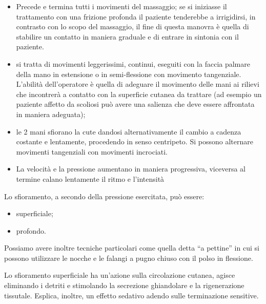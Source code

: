 \begin{itemize}
\item

  Precede e termina tutti i movimenti del massaggio; se si iniziasse il
  trattamento con una frizione profonda il paziente tenderebbe a
  irrigidirsi, in contrasto con lo scopo del massaggio, il fine di
  questa manovra è quella di stabilire un contatto in maniera graduale e
  di entrare in sintonia con il paziente.

\item

  si tratta di movimenti leggerissimi, continui, eseguiti con la faccia
  palmare della mano in estensione o in semi-flessione con movimento
  tangenziale. L'abilità dell'operatore è quella di adeguare il
  movimento delle mani ai rilievi che incontrerà a contatto con la
  superficie cutanea da trattare (ad esempio un paziente affetto da
  scoliosi può avere una salienza che deve essere affrontata in maniera
  adeguata);

\item

  le 2 mani sfiorano la cute dandosi alternativamente il cambio a
  cadenza costante e lentamente, procedendo in senso centripeto. Si
  possono alternare movimenti tangenziali con movimenti incrociati.

\item

  La velocità e la pressione aumentano in maniera progressiva, viceversa
  al termine calano lentamente il ritmo e l'intensità

\end{itemize}

Lo sfioramento, a secondo della pressione esercitata, può essere:

\begin{itemize}
\item
  superficiale;
\item
  profondo.
\end{itemize}

Possiamo avere inoltre tecniche particolari come quella detta ``a
pettine'' in cui si possono utilizzare le nocche e le falangi a pugno
chiuso con il polso in flessione.

Lo sfioramento superficiale ha un'azione sulla circolazione cutanea,
agisce eliminando i detriti e stimolando la secrezione ghiandolare e la
rigenerazione tissutale. Esplica, inoltre, un effetto sedativo adendo
sulle terminazione sensitive.

